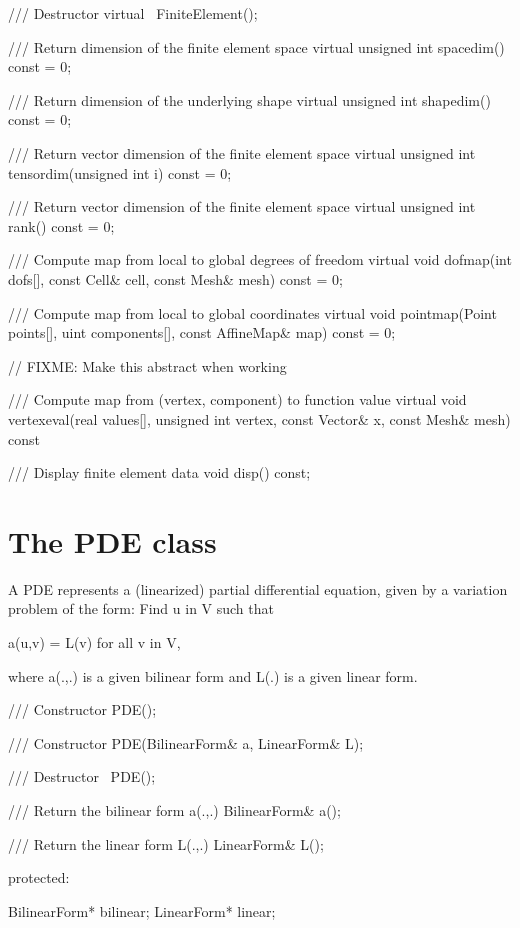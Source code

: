     /// Destructor
    virtual ~FiniteElement();
    
    /// Return dimension of the finite element space
    virtual unsigned int spacedim() const = 0;

    /// Return dimension of the underlying shape
    virtual unsigned int shapedim() const = 0;

    /// Return vector dimension of the finite element space
    virtual unsigned int tensordim(unsigned int i) const = 0;

    /// Return vector dimension of the finite element space
    virtual unsigned int rank() const = 0;
    
    /// Compute map from local to global degrees of freedom
    virtual void dofmap(int dofs[], const Cell& cell, const Mesh& mesh) const = 0;

    /// Compute map from local to global coordinates
    virtual void pointmap(Point points[], uint components[], const AffineMap& map) const = 0;

    // FIXME: Make this abstract when working

    /// Compute map from (vertex, component) to function value
    virtual void vertexeval(real values[], unsigned int vertex, const Vector& x, const Mesh& mesh) const {}

    /// Display finite element data
    void disp() const;

\section{The PDE class}

A PDE represents a (linearized) partial differential equation,
given by a variation problem of the form: Find u in V such that

    a(u,v) = L(v) for all v in V,

where a(.,.) is a given bilinear form and L(.) is a given linear form.

    /// Constructor
    PDE();

    /// Constructor
    PDE(BilinearForm& a, LinearForm& L);

    /// Destructor
    ~PDE();

    /// Return the bilinear form a(.,.)
    BilinearForm& a();

    /// Return the linear form L(.,.)
    LinearForm& L();

  protected:

    BilinearForm* bilinear;
    LinearForm* linear;




